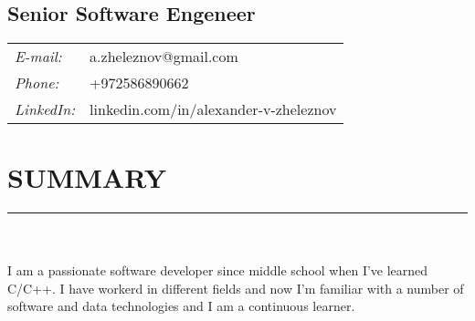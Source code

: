 \documentclass[a4paper,oneside,12pt]{article}
\newcommand{\cvpart}[1]{%
\vspace{-1em}%
\section*{\large\bfseries\MakeTextUppercase{#1}}%
\vspace{-1em}%
\rule{\linewidth}{0.3em}\\[-.3em]%
}
\begin{document}
\begin{flushleft}
\vspace{-3em}{\Huge\bfseries Alexander Zheleznov }

~\\[-.5em]
\begin{multicols}{2}

\section*{\Large\bfseries Senior Software Engeneer}%
\columnbreak
\begin{tabularx}{\linewidth}{ll}
{\it E-mail:}		& a.zheleznov@gmail.com\\
{\it Phone:}	    & {\small +972586890662} \\
{\it LinkedIn:}		& linkedin.com/in/alexander-v-zheleznov\\
\end{tabularx}
\end{multicols}
\end{flushleft}

\cvpart{Summary}
~\\
I am a passionate software developer since middle school when I've learned  C/C++. 
I have workerd in different fields and now I'm familiar with a number of software and data technologies and I am a continuous learner.

~\\
\end{document}
